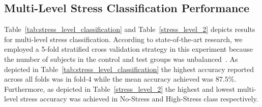 \subsection{Multi-Level Stress Classification Performance} Table~\ref{tab:stress_level_classification} and Table~\ref{stress_level_2} depicts results for multi-level stress classification. According to state-of-the-art research, we employed a 5-fold stratified cross validation strategy in this experiment because the number of subjects in the control and test groups was unbalanced~\cite{ziaratnia2024multimodal}. As depicted in Table~\ref{tab:stress_level_classification} the highest accuracy reported across all folds was in fold-4 while the mean accuracy achieved was $87.5\%$. Furthermore, as depicted in Table~\ref{stress_level_2}  the highest and lowest  multi-level stress accuracy was achieved in No-Stress and High-Stress class respectively.

